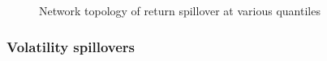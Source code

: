 \documentclass[
  letterpaper,
  DIV=11,
  numbers=noendperiod]{scrartcl}
\begin{document}
\begin{figure}[H]
\begin{minipage}[t]{0.50\linewidth}
{{}

}

\end{minipage}%
\newline
\begin{minipage}[t]{\linewidth}

{\centering 


}

\end{minipage}%

\caption{\label{fig-rtn}Network topology of return spillover at various
quantiles}

\end{figure}

\hypertarget{volatility-spillovers}{%
\subsubsection{Volatility spillovers}\label{volatility-spillovers}}
\end{document}
